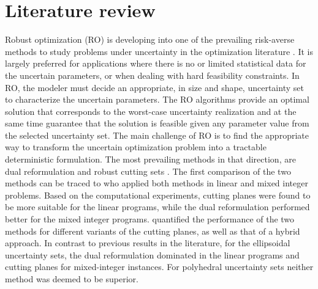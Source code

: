 \documentclass[sn-mathphys-num]{sn-jnl}
\begin{document}
\section{Literature review}\label{LR}
Robust optimization (RO) is developing into one of the prevailing risk-averse methods to study problems under uncertainty in the optimization literature \citep{Zhang2022,Gabrel2014}. It is largely preferred for applications where there is no or limited statistical data for the uncertain parameters, or when dealing with hard feasibility constraints. In RO, the modeler must decide an appropriate, in size and shape, uncertainty set to characterize the uncertain parameters. The RO algorithms provide an optimal solution that corresponds to the worst-case uncertainty realization and at the same time guarantee that the solution is feasible given any parameter value from the selected uncertainty set. The main challenge of RO is to find the appropriate way to transform the uncertain optimization problem into a tractable deterministic formulation. The most prevailing methods in that direction, are dual reformulation \citep{Bental98, Gorissesn2015,Li2011} and robust cutting sets \citep{Mutapcic2009,Isenberg2021}. The first comparison of the two methods can be traced to \citet{Fischetti2012} who applied both methods in linear and mixed integer problems. Based on the computational experiments, cutting planes were found to be more suitable for the linear programs, while the dual reformulation performed better for the mixed integer programs. \citet{Bertsimas2016} quantified the performance of the two methods for different variants of the cutting planes, as well as that of a hybrid approach. In contrast to previous results in the literature, for the ellipsoidal uncertainty sets, the dual reformulation dominated in the linear programs and cutting planes for mixed-integer instances. For polyhedral uncertainty sets neither method was deemed to be superior.
\end{document}

